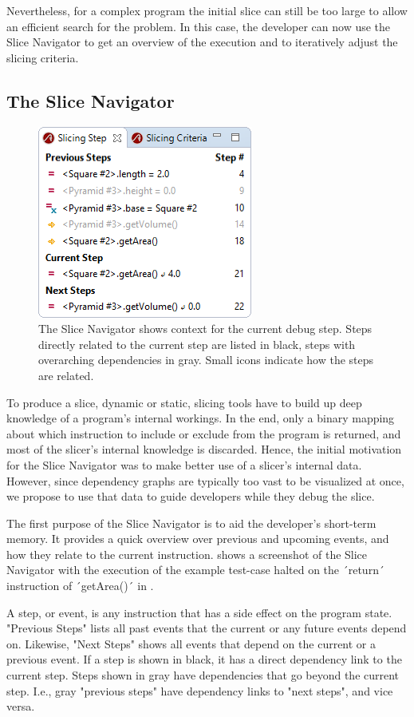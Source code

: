 Nevertheless, for a complex program the initial slice can still be too large to allow an efficient search for the problem.
In this case, the developer can now use the Slice Navigator to get an overview of the execution and to iteratively adjust the slicing criteria.

\subsection{The Slice Navigator}

\begin{figure}
	\centering
		\includegraphics[width=0.40\linewidth]{img/slice1.png}
	\caption{The Slice Navigator shows context for the current debug step. Steps directly related to the current step are listed in black, steps with overarching dependencies in gray. Small icons indicate how the steps are related.}
	\label{fig:slice1}
\end{figure}

To produce a slice, dynamic or static, slicing tools have to build up deep knowledge of a program's internal workings.
In the end, only a binary mapping about which instruction to include or exclude from the program is returned, and most of the slicer's internal knowledge is discarded.
Hence, the initial motivation for the Slice Navigator was to make better use of a slicer's internal data.
However, since  dependency graphs are typically too vast to be visualized at once, we propose to use that data to guide developers while they debug the slice.

The first purpose of the Slice Navigator is to aid the developer's short-term memory.
It provides a quick overview over previous and upcoming events, and how they relate to the current instruction.
 shows a screenshot of the Slice Navigator with the execution of the example test-case halted on the ´return´ instruction of ´getArea()´ in .

A step, or event, is any instruction that has a side effect on the program state.
"Previous Steps" lists all past events that the current or any future events depend on.
Likewise, "Next Steps" shows all events that depend on the current or a previous event.
%
If a step is shown in black, it has a direct dependency link to the current step.
Steps shown in gray have dependencies that go beyond the current step.
I.e., gray "previous steps" have dependency links to "next steps", and vice versa.


